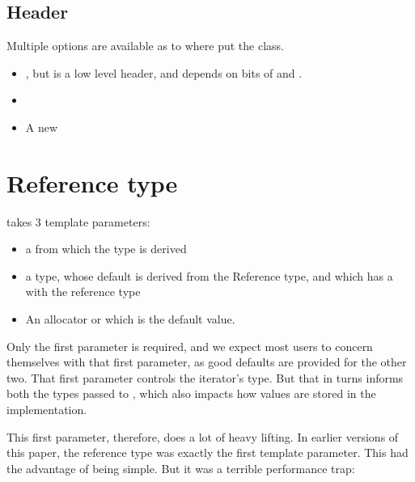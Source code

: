\documentclass{wg21}
\begin{document}
\subsection{Header}

Multiple options are available as to where put the  class.

\begin{itemize}
    \item {}, but  is a low level header, and  depends on bits of  and .

    \item {}

    \item A new 

\end{itemize}

\section{Reference type}

 takes 3 template parameters:


\begin{itemize}
\item a  from which the  type is derived
\item a  type, whose default is derived from the Reference type, and which has a \mbox{} with the reference type
\item An allocator or  which is the default value.
\end{itemize}

Only the first parameter is required, and we expect most users to concern themselves with that first parameter, as good defaults are provided for the other two.
That first parameter controls the iterator's  type. But that in turns informs both the types passed to ,
which also impacts how values are stored in the implementation.

This first  parameter, therefore, does a lot of heavy lifting.
In earlier versions of this paper, the reference type was exactly the first template parameter.
This had the advantage of being simple.
But it was a terrible performance trap:
\end{document}
